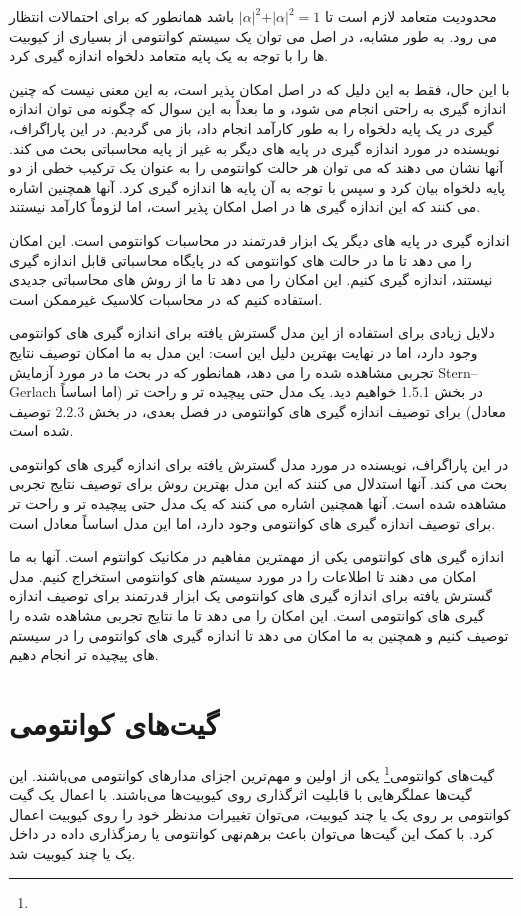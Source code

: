\documentclass{book}
\begin{document}
محدودیت متعامد لازم است تا $\vert\alpha\vert ^ 2 + \vert\alpha\vert ^ 2 = 1$ باشد همانطور که برای احتمالات انتظار می رود. به طور مشابه، در اصل می توان یک سیستم کوانتومی از بسیاری از کیوبیت ها را با توجه به یک پایه متعامد دلخواه اندازه گیری کرد.

با این حال، فقط به این دلیل که در اصل امکان پذیر است، به این معنی نیست که چنین اندازه گیری به راحتی انجام می شود، و ما بعداً به این سوال که چگونه می توان اندازه گیری در یک پایه دلخواه را به طور کارآمد انجام داد، باز می گردیم.
در این پاراگراف، نویسنده در مورد اندازه گیری در پایه های دیگر به غیر از پایه محاسباتی بحث می کند. آنها نشان می دهند که می توان هر حالت کوانتومی را به عنوان یک ترکیب خطی از دو پایه دلخواه بیان کرد و سپس با توجه به آن پایه ها اندازه گیری کرد. آنها همچنین اشاره می کنند که این اندازه گیری ها در اصل امکان پذیر است، اما لزوماً کارآمد نیستند.

اندازه گیری در پایه های دیگر یک ابزار قدرتمند در محاسبات کوانتومی است. این امکان را می دهد تا ما در حالت های کوانتومی که در پایگاه محاسباتی قابل اندازه گیری نیستند، اندازه گیری کنیم. این امکان را می دهد تا ما از روش های محاسباتی جدیدی استفاده کنیم که در محاسبات کلاسیک غیرممکن است.

دلایل زیادی برای استفاده از این مدل گسترش یافته برای اندازه گیری های کوانتومی وجود دارد، اما در نهایت بهترین دلیل این است: این مدل به ما امکان توصیف نتایج تجربی مشاهده شده را می دهد، همانطور که در بحث ما در مورد آزمایش Stern–Gerlach در بخش 1.5.1 خواهیم دید. یک مدل حتی پیچیده تر و راحت تر (اما اساساً معادل) برای توصیف اندازه گیری های کوانتومی در فصل بعدی، در بخش 2.2.3 توصیف شده است.

در این پاراگراف، نویسنده در مورد مدل گسترش یافته برای اندازه گیری های کوانتومی بحث می کند. آنها استدلال می کنند که این مدل بهترین روش برای توصیف نتایج تجربی مشاهده شده است. آنها همچنین اشاره می کنند که یک مدل حتی پیچیده تر و راحت تر برای توصیف اندازه گیری های کوانتومی وجود دارد، اما این مدل اساساً معادل است.

اندازه گیری های کوانتومی یکی از مهمترین مفاهیم در مکانیک کوانتوم است. آنها به ما امکان می دهند تا اطلاعات را در مورد سیستم های کوانتومی استخراج کنیم. مدل گسترش یافته برای اندازه گیری های کوانتومی یک ابزار قدرتمند برای توصیف اندازه گیری های کوانتومی است. این امکان را می دهد تا ما نتایج تجربی مشاهده شده را توصیف کنیم و همچنین به ما امکان می دهد تا اندازه گیری های کوانتومی را در سیستم های پیچیده تر انجام دهیم. 



\newpage
\section{گیت‌های کوانتومی}
گیت‌های کوانتومی\footnote{} یکی از اولین و مهم‌ترین اجزای‌ مدار‌های کوانتومی ‌می‌باشند. این گیت‌ها عملگر‌هایی با قابلیت اثر‌گذاری روی کیوبیت‌ها می‌باشند. با اعمال یک گیت کوانتومی بر روی یک یا چند کیوبیت، می‌توان تغییرات مدنظر خود را روی کیوبیت اعمال کرد. با کمک این گیت‌ها می‌توان باعث برهم‌نهی کوانتومی یا رمز‌گذاری داده در داخل یک یا چند کیوبیت شد.
\end{document}
